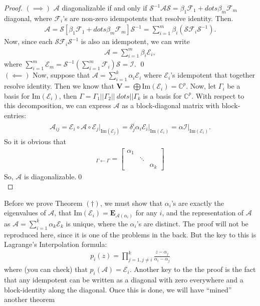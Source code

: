 \documentclass{article}
\theoremstyle{definition}
\newcommand{\F}{\mathcal{F}}
\newcommand{\C}{\mathbb{C}}
\newcommand{\V}{\mathbf{V}}
\newcommand{\A}{\mathcal{A}}
\newcommand{\E}{\mathcal{E}}
\newcommand{\ima}{\text{Im}}
\newcommand{\s}{\mathcal{S}}
\newcommand{\lp}{\left(}
\newcommand{\rp}{\right)}
\newcommand{\lb}{\left[}
\newcommand{\rb}{\right]}
\begin{document}
\begin{proof}
	$(\implies)$ $\A$ diagonalizable if and only if $\s^{-1}\A\s = \beta_1\F_1 + dots \beta_m\F_m$ diagonal, where $\F_i$'s are non-zero idempotents that resolve identity. Then.
	\begin{align*}
	\A = \s \lb \beta_1\F_1 + dots \beta_m\F_m \rb \s^{-1} = \sum^{m}_{i=1}\beta_i (\s\F_i\s^{-1}).
	\end{align*} 
	Now, since each $\s\F_i\s^{-1}$ is also an idempotent, we can write
	\begin{align*}
	\A = \sum^{m}_{i=1}\beta_i\E_i,
	\end{align*}
	where $\sum^m_{i=1}\E_m = \s^{-1}\lp\sum^m_{i=1}\F_i \rp\s = \mathcal{I}$. \qed\\
	
	
	$(\impliedby)$ Now, suppose that $\A = \sum^k_{i=1}\alpha_i\E_i$ where $\E_i$'s idempotent that together resolve identity. Then we know that $\V = \bigoplus \ima(\E_i) = \mathbb{C}^p$. Now, let $\Gamma_i$ be a basis for $\ima(\E_i)$, then $\Gamma = \Gamma_1 \vert\vert \Gamma_2 \vert\vert\ dots \vert\vert\Gamma_k$ is a basis for $\C^p$. With respect to this decomposition, we can express $\A$ as a block-diagonal matrix with block-entries:
	\begin{align*}
	\A_{ij} = \E_i \circ \A \circ \E_j\bigg\vert_{\ima(\E_j)} = \delta^i_j \alpha_i\E_i\bigg\vert_{\ima(\E_i)} = \alpha \mathcal{I}\bigg\vert_{\ima(\E_i)}.
	\end{align*}
	So it is obvious that
	\begin{align*}
	[\A]_{\Gamma\leftarrow\Gamma} = \begin{bmatrix}
	\alpha_1 & & \\
	& \ddots & \\
	& & \alpha_k
	\end{bmatrix}
	\end{align*}
	So, $\A$ is diagonalizable.\qed  \\
\end{proof}

Before we prove Theorem $(\dagger)$, we must show that $\alpha_i$'s are exactly the eigenvalues of $\A$, that $\ima(\E_i) = \mathbf{E}_{\A(\alpha_i)}$ for any $i$, and the representation of $\A$ as $\A = \sum^k_{i=1}\alpha_k\E_k$ is unique, where the $\alpha_i$'s are distinct. The proof will not be reproduced here, since it is one of the problems in the back. But the key to this is Lagrange's Interpolation formula:
\begin{align*}
p_i(z) = \prod^k_{j=1, j\neq i} \frac{z - \alpha_j}{\alpha_i - \alpha_j}
\end{align*} 
where (you can check) that $p_i(\A) = \E_i$. Another key to the the proof is the fact that any idempotent can be written as a diagonal with zero everywhere and a block-identity along the diagonal. Once this is done, we will have ``mined'' another theorem
\end{document}
